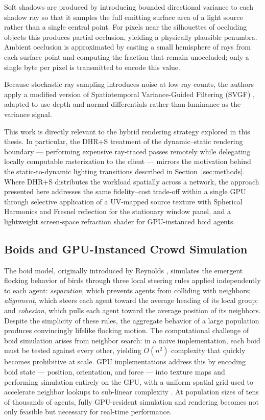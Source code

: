 \documentclass[12pt]{article}
\begin{document}
Soft shadows are produced by introducing bounded directional variance to each shadow ray so that it samples the full emitting surface area of a light source rather than a single central point. For pixels near the silhouettes of occluding objects this produces partial occlusion, yielding a physically plausible penumbra. Ambient occlusion is approximated by casting a small hemisphere of rays from each surface point and computing the fraction that remain unoccluded; only a single byte per pixel is transmitted to encode this value.
 
Because stochastic ray sampling introduces noise at low ray counts, the authors apply a modified version of Spatiotemporal Variance-Guided Filtering (SVGF) \cite{Schied2017}, adapted to use depth and normal differentials rather than luminance as the variance signal.
 
This work is directly relevant to the hybrid rendering strategy explored in this thesis. In particular, the DHR+S treatment of the dynamic--static rendering boundary --- performing expensive ray-traced passes remotely while delegating locally computable rasterization to the client --- mirrors the motivation behind the static-to-dynamic lighting transitions described in Section~\ref{sec:methods}. Where DHR+S distributes the workload spatially across a network, the approach presented here addresses the same fidelity--cost trade-off within a single GPU through selective application of a UV-mapped source texture with Spherical Harmonics and Fresnel reflection for the stationary window panel, and a lightweight screen-space refraction shader for GPU-instanced boid agents.

\subsection{Boids and GPU-Instanced Crowd Simulation}
The boid model, originally introduced by Reynolds \cite{Reynolds1987}, simulates the emergent flocking behavior of birds through three local steering rules applied independently to each agent: \textit{separation}, which prevents agents from colliding with neighbors; \textit{alignment}, which steers each agent toward the average heading of its local group; and \textit{cohesion}, which pulls each agent toward the average position of its neighbors. Despite the simplicity of these rules, the aggregate behavior of a large population produces convincingly lifelike flocking motion.
The computational challenge of boid simulation arises from neighbor search: in a naive implementation, each boid must be tested against every other, yielding $O(n^2)$ complexity that quickly becomes prohibitive at scale. GPU implementations address this by encoding boid state --- position, orientation, and force --- into texture maps and performing simulation entirely on the GPU, with a uniform spatial grid used to accelerate neighbor lookups to sub-linear complexity \cite{Silva2008}. At population sizes of tens of thousands of agents, fully GPU-resident simulation and rendering becomes not only feasible but necessary for real-time performance.
\end{document}
